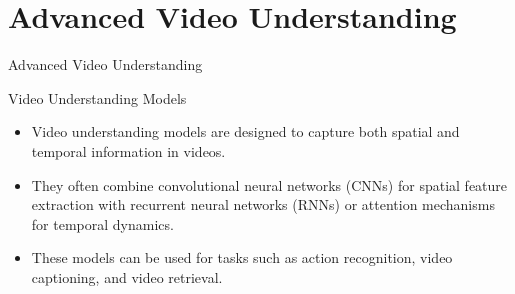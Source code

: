 \section{Advanced Video Understanding}
\begin{frame}{}
    \LARGE Advanced Video Understanding
\end{frame}

\begin{frame}{Video Understanding Models}
    \begin{itemize}
        \item Video understanding models are designed to capture both spatial and temporal information in videos.
        \item They often combine convolutional neural networks (CNNs) for spatial feature extraction with recurrent neural networks (RNNs) or attention mechanisms for temporal dynamics.
        \item These models can be used for tasks such as action recognition, video captioning, and video retrieval.
    \end{itemize}
\end{frame}







